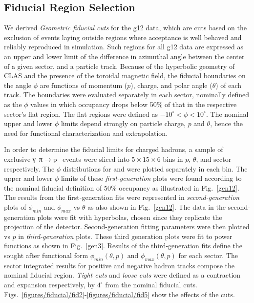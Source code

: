 \subsection{\label{sec:fiducial}Fiducial Region Selection}

We derived \emph{Geometric fiducial cuts} for the g12 data, which are cuts based on the exclusion of events laying outside regions where acceptance is well behaved and reliably reproduced in simulation. Such regions for all g12 data are expressed as an upper and lower limit of the difference in azimuthal angle between the center of a given sector, and a particle track.  Because of the hyperbolic geometry of CLAS and the presence of the toroidal magnetic field, the fiducial boundaries on the angle $\phi$ are functions of momentum ($p$), charge, and polar angle ($\theta$) of each track. The boundaries were evaluated separately in each sector, nominally defined as the $\phi$ values in which occupancy drops below 50\% of that in the respective sector's flat region. The flat regions were defined as $-10^{\circ} < \phi < 10^{\circ}$. The nominal upper and lower $\phi$ limits depend strongly on particle charge, $p$ and $\theta$, hence the need for functional characterization and extrapolation.

In order to determine the fiducial limits for charged hadrons, a sample of exclusive \mbox{γ π$\to$p \π[+] \π[-]} events were sliced into $5\times15\times6$ bins in $p$, $\theta$, and sector respectively. The $\phi$ distributions for \π[+] and \π[-] were plotted separately in each bin. The upper and lower $\phi$ limits of these \emph{first-generation} plots were found according to the nominal fiducial definition of 50\% occupancy as illustrated in Fig.~\ref{gen12}. The results from the first-generation fits were represented in \emph{second-generation} plots of $\phi_{min}$ and $\phi_{max}$ vs $\theta$ as also shown in Fig.~\ref{gen12}.  The data in the second-generation plots were fit with hyperbolas, chosen since they replicate the projection of the detector.  Second-generation fitting parameters were then plotted vs $p$ in \emph{third-generation} plots. These third generation plots were fit to power functions as shown in Fig.~\ref{gen3}. Results of the third-generation fits define the sought after functional form $\phi_{min}(\theta,p)$ and $\phi_{max}(\theta,p)$ for each sector. The sector integrated results for positive and negative hadron tracks compose the nominal fiducial region. \emph{Tight cuts} and \emph{loose cuts} were defined as a contraction and expansion respectively, by $4^\circ$ from the nominal fiducial cuts. Figs.~\ref{figures/fiducial/fid2}-\ref{figures/fiducial/fid5} show the effects of the cuts.

